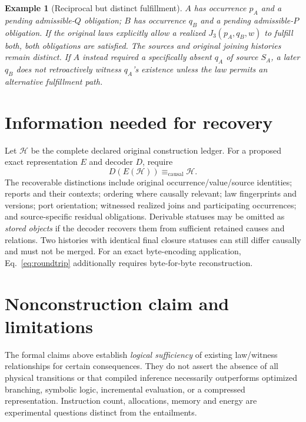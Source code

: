 \documentclass[11pt]{article}
\newtheorem{example}[definition]{Example}
\newcommand{\Hist}{\mathcal{H}}
\begin{document}
\begin{example}[Reciprocal but distinct fulfillment]
$A$ has occurrence $p_A$ and a pending admissible-$Q$ obligation;
$B$ has occurrence $q_B$ and a pending admissible-$P$ obligation.
If the original laws explicitly allow a realized $J_3(p_A,q_B,w)$
to fulfill both, both obligations are satisfied. The sources
and original joining histories remain distinct. If $A$ instead
required a specifically absent $q_A$ of source $S_A$, a later
$q_B$ does not retroactively witness $q_A$'s existence unless
the law permits an alternative fulfillment path.
\end{example}

\section{Information needed for recovery}
Let $\Hist$ be the complete declared original construction ledger.
For a proposed exact representation $E$ and decoder $D$, require
\begin{equation}\label{eq:roundtrip}
       D(E(\Hist))\equiv_{\mathrm{causal}}\Hist.
\end{equation}
The recoverable distinctions include original occurrence/value/source
identities; reports and their contexts; ordering where causally relevant;
law fingerprints and versions; port orientation; witnessed realized joins
and participating occurrences; and source-specific residual obligations.
Derivable statuses may be omitted as \emph{stored objects} if the decoder
recovers them from sufficient retained causes and relations.
Two histories with identical final closure statuses can still differ
causally and must not be merged. For an exact byte-encoding application,
Eq.~\eqref{eq:roundtrip} additionally requires byte-for-byte reconstruction.

\section{Nonconstruction claim and limitations}
The formal claims above establish \emph{logical sufficiency} of existing
law/witness relationships for certain consequences. They do not assert
the absence of all physical transitions or that compiled inference
necessarily outperforms optimized branching, symbolic logic,
incremental evaluation, or a compressed representation.
Instruction count, allocations, memory and energy are experimental
questions distinct from the entailments.
\end{document}
